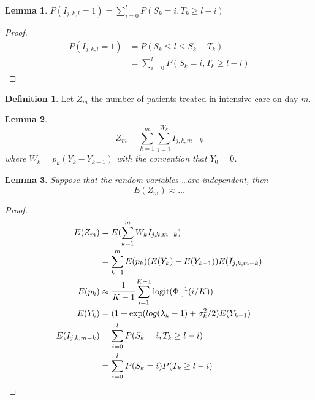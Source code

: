 \documentclass[10pt,twocolumn,a4paper]{article}
\theoremstyle{definition}
\newtheorem{definition}{Definition}
\theoremstyle{remark}
\theoremstyle{plain}
\newtheorem{lemma}{Lemma}
\begin{document}
\begin{lemma}

  $P(I_{j,k,l}=1) = \sum\limits_{i=0}^l P(S_k = i, T_k \ge l-i)$

\end{lemma}

\begin{proof}

  \begin{align*}
    P(I_{j,k,l}=1) &= P(S_k \le l \le S_k + T_k) \\
                   &= \sum\limits_{i=0}^l P(S_k = i, T_k \ge l-i)
  \end{align*}

\end{proof}

\begin{definition}

  Let $Z_m$ the number of patients treated in intensive care on day $m$.

\end{definition}

\begin{lemma}

  \[ Z_m = \sum\limits_{k=1}^m \sum\limits_{j=1}^{W_k} I_{j,k,m-k} \]
  where $W_k = p_k (Y_k - Y_{k-1})$ with the convention that $Y_0 = 0$.

\end{lemma}


\begin{lemma}

  Suppose that the random variables \dots are independent, then
  \[ E(Z_m) \approx \dots \]

\end{lemma}

\begin{proof}

  \begin{align*}
    E(Z_m) &= E(\sum_{k=1}^m W_k I_{j,k,m-k}) \\
           &= \sum_{k=1}^m E(p_k) (E(Y_k) - E(Y_{k-1})) E(I_{j,k,m-k}) \\
    E(p_k) &\approx \cfrac{1}{K-1} \sum_{i=1}^{K-1}
                    \text{logit}(\Phi_{.,.}^{-1}(i/K)) \\
    E(Y_k) &= (1 + \exp(log(\lambda_k-1)+\sigma_k^2/2) E(Y_{k-1}) \\
    E(I_{j,k,m-k}) &= \sum_{i=0}^l P(S_k = i, T_k \ge l-i) \\
                   &= \sum_{i=0}^l P(S_k = i) P(T_k \ge l-i)
  \end{align*}

\end{proof}
\end{document}
